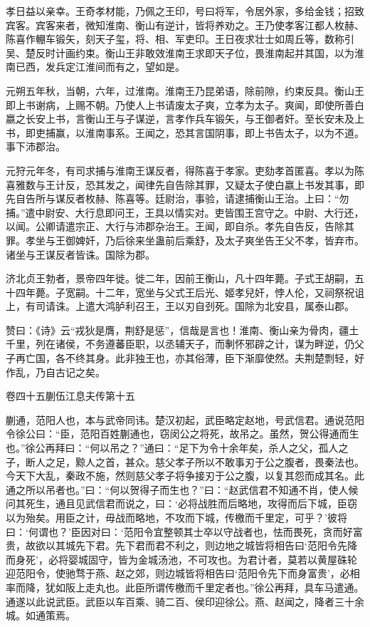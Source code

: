 \documentclass[12pt,UTF8]{ctexbook}
\begin{document}
孝日益以亲幸。王奇孝材能，乃佩之王印，号曰将军，令居外家，多给金钱；招致宾客。宾客来者，微知淮南、衡山有逆计，皆将养劝之。王乃使孝客江都人枚赫、陈喜作輣车锻矢，刻天子玺，将、相、军吏印。王日夜求壮士如周丘等，数称引吴、楚反时计画约束。衡山王非敢效淮南王求即天子位，畏淮南起并其国，以为淮南已西，发兵定江淮间而有之，望如是。



元朔五年秋，当朝，六年，过淮南。淮南王乃昆弟语，除前隙，约束反具。衡山王即上书谢病，上赐不朝。乃使人上书请废太子爽，立孝为太子。爽闻，即使所善白嬴之长安上书，言衡山王与子谋逆，言孝作兵车锻矢，与王御者奸。至长安未及上书，即吏捕赢，以淮南事系。王闻之，恐其言国阴事，即上书告太子，以为不道。事下沛郡治。



元狩元年冬，有司求捕与淮南王谋反者，得陈喜于孝家。吏劾孝首匿喜。孝以为陈喜雅数与王计反，恐其发之，闻律先自告除其罪，又疑太子使白嬴上书发其事，即先自告所与谋反者枚赫、陈喜等。廷尉治，事验，请逮捕衡山王治。上曰：“勿捕。”遣中尉安、大行息即问王，王具以情实对。吏皆围王宫守之。中尉、大行还，以闻。公卿请遣宗正、大行与沛郡杂治王。王闻，即自杀。孝先自告反，告除其罪。孝坐与王御婢奸，乃后徐来坐蛊前后乘舒，及太子爽坐告王父不孝，皆弃市。诸坐与王谋反者皆诛。国除为郡。



济北贞王勃者，景帝四年徙。徙二年，因前王衡山，凡十四年薨。子式王胡嗣，五十四年薨。子宽嗣。十二年，宽坐与父式王后光、姬孝兒奸，悖人伦，又祠祭祝诅上，有司请诛。上遣大鸿胪利召王，王以刃自刭死。国除为北安县，属泰山郡。



赞曰：《诗》云“戎狄是膺，荆舒是惩”，信哉是言也！淮南、衡山亲为骨肉，疆土千里，列在诸侯，不务遵蕃臣职，以丞辅天子，而剸怀邪辟之计，谋为畔逆，仍父子再亡国，各不终其身。此非独王也，亦其俗薄，臣下渐靡使然。夫荆楚剽轻，好作乱，乃自古记之矣。





卷四十五蒯伍江息夫传第十五



蒯通，范阳人也，本与武帝同讳。楚汉初起，武臣略定赵地，号武信君。通说范阳令徐公曰：“臣，范阳百姓蒯通也，窃闵公之将死，故吊之。虽然，贺公得通而生也。”徐公再拜曰：“何以吊之？”通曰：“足下为令十余年矣，杀人之父，孤人之子，断人之足，黥人之首，甚众。慈父孝子所以不敢事刃于公之腹者，畏秦法也。今天下大乱，秦政不施，然则慈父孝子将争接刃于公之腹，以复其怨而成其名。此通之所以吊者也。”曰：“何以贺得子而生也？”曰：“赵武信君不知通不肖，使人候问其死生，通且见武信君而说之，曰：‘必将战胜而后略地，攻得而后下城，臣窃以为殆矣。用臣之计，毋战而略地，不攻而下城，传檄而千里定，可乎？’彼将曰：‘何谓也？’臣因对曰：‘范阳令宜整顿其士卒以守战者也，怯而畏死，贪而好富贵，故欲以其城先下君。先下君而君不利之，则边地之城皆将相告曰‘范阳令先降而身死’，必将婴城固守，皆为金城汤池，不可攻也。为君计者，莫若以黄屋硃轮迎范阳令，使驰骛于燕、赵之郊，则边城皆将相告曰‘范阳令先下而身富贵’，必相率而降，犹如阪上走丸也。此臣所谓传檄而千里定者也。”徐公再拜，具车马遣通。通遂以此说武臣。武臣以车百乘、骑二百、侯印迎徐公。燕、赵闻之，降者三十余城。如通策焉。
\end{document}

